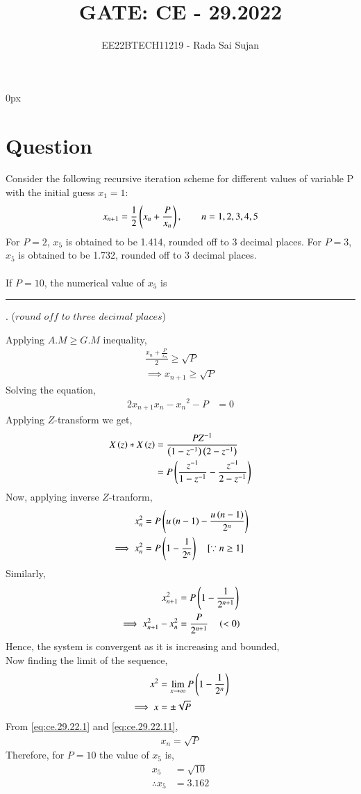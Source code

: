 \documentclass[journal,12pt,twocolumn]{IEEEtran}
\theoremstyle{remark}
\begin{document}
\parindent 0px

\title{GATE: CE - 29.2022}
\author{EE22BTECH11219 - Rada Sai Sujan$^{}$%
}
\maketitle
\newpage
\bigskip
\section*{Question}
Consider the following recursive iteration scheme for different values of variable P with the initial guess $x_1=1$:
$$x_{n+1}=\frac{1}{2}\left(x_n+\frac{P}{x_n}\right), \quad\quad n=1,2,3,4,5 $$
For $P=2$, $x_5$ is obtained to be 1.414, rounded off to 3 decimal places. For $P=3$, $x_5$ is obtained to be 1.732, rounded off to 3 decimal places.   \\ \\
If $P=10$, the numerical value of $x_5$ is \rule{1.3cm}{0.15mm} . ($round$ $off$ $to$ $three$ $decimal$ $places$)   \\
\solution 

Applying $A.M \geq G.M$ inequality,
\begin{align}
    \frac{x_n+\frac{P}{x_n}}{2} \geq \sqrt{P}   \\
    \implies x_{n+1} \geq \sqrt{P}  \label{eq:ce.29.22.1}
\end{align}
Solving the equation,
\begin{align}
    2x_{n+1}x_{n} - {x_n}^2 - P &=0
\end{align}
Applying $Z$-transform we get,
\begin{align}
    X\left(z\right) \ast X\left(z\right) &= \frac{PZ^{-1}}{\left(1-z^{-1}\right)\left(2-z^{-1}\right)}  \\
    &= P\left(\frac{z^{-1}}{1-z^{-1}} - \frac{z^{-1}}{2-z^{-1}}\right)
\end{align}
Now, applying inverse $Z$-tranform,
\begin{align}
    x_n^2 &= P\left(u\left(n-1\right) - \frac{u\left(n-1\right)}{2^n}\right)  \\
    \implies x_n^2 &=P\left(1-\frac{1}{2^n}\right) \quad \text{[$\because n \geq 1$]}
\end{align}
Similarly,
\begin{align}
    x_{n+1}^2 &= P\left(1 - \frac{1}{2^{n+1}}\right)  \\
    \implies x_{n+1}^2 - x_n^2 &= \frac{P}{2^{n+1}}\quad \left(<0\right)
\end{align}
Hence, the system is convergent as it is increasing and bounded,    \\
Now finding the limit of the sequence,
\begin{align}
    x^2 &=\lim\limits_{x\to\infty}P\left(1-\frac{1}{2^n}\right)   \\
    \implies x &= \pm\sqrt{P}   \label{eq:ce.29.22.11}
\end{align}
From \eqref{eq:ce.29.22.1} and \eqref{eq:ce.29.22.11},
\begin{align}
    x_n=\sqrt{P}
\end{align}
Therefore, for $P=10$ the value of $x_5$ is,
\begin{align}
    x_5&=\sqrt{10}  \\
    \therefore x_5&=3.162
\end{align}
\end{document}
